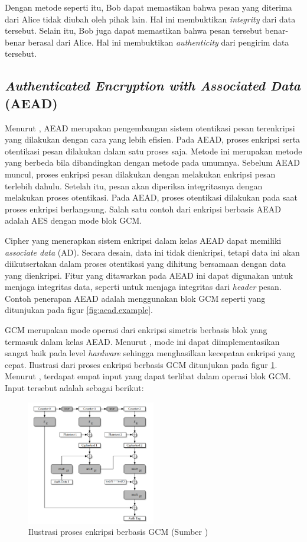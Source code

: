 \documentclass[conference]{IEEEtran}
\begin{document}
Dengan metode seperti itu, Bob dapat memastikan bahwa pesan yang diterima dari Alice tidak diubah oleh pihak lain. Hal ini membuktikan \emph{integrity} dari data tersebut. Selain itu, Bob juga dapat memastikan bahwa pesan tersebut benar-benar berasal dari Alice. Hal ini membuktikan \emph{authenticity} dari pengirim data tersebut.

\subsection{\emph{Authenticated Encryption with Associated Data} (AEAD)}
\label{sec:aead}

Menurut \cite{b4}, AEAD merupakan pengembangan sistem otentikasi pesan terenkripsi yang dilakukan dengan cara yang lebih efisien. Pada AEAD, proses enkripsi serta otentikasi pesan dilakukan dalam satu proses saja. Metode ini merupakan metode yang berbeda bila dibandingkan dengan metode pada umumnya. Sebelum AEAD muncul, proses enkripsi pesan dilakukan dengan melakukan enkripsi pesan terlebih dahulu. Setelah itu, pesan akan diperiksa integritasnya dengan melakukan proses otentikasi. Pada AEAD, proses otentikasi dilakukan pada saat proses enkripsi berlangsung. Salah satu contoh dari enkripsi berbasis AEAD adalah AES dengan mode blok GCM.

Cipher yang menerapkan sistem enkripsi dalam kelas AEAD dapat memiliki \emph{associate data} (AD). Secara desain, data ini tidak dienkripsi, tetapi data ini akan diikutsertakan dalam proses otentikasi yang dihitung bersamaan dengan data yang dienkripsi. Fitur yang ditawarkan pada AEAD ini dapat digunakan untuk menjaga integritas data, seperti untuk menjaga integritas dari \emph{header} pesan. Contoh penerapan AEAD adalah menggunakan blok GCM seperti yang ditunjukan pada figur \ref{fig:aead.example}.


GCM merupakan mode operasi dari enkripsi simetris berbasis blok yang termasuk dalam kelas AEAD. Menurut \cite{b6}, mode ini dapat diimplementasikan sangat baik pada level \emph{hardware} sehingga menghasilkan kecepatan enkripsi yang cepat. Ilustrasi dari proses enkripsi berbasis GCM ditunjukan pada figur \ref{fig1}. Menurut \cite{b6}, terdapat empat input yang dapat terlibat dalam operasi blok GCM. Input tersebut adalah sebagai berikut:

\begin{figure}[htbp]
    \centerline{\includegraphics[width=0.5\textwidth]{res/fig1.png}}

    \caption{Ilustrasi proses enkripsi berbasis GCM (Sumber \cite{b6})}
    \label{fig1}
\end{figure}
\end{document}
